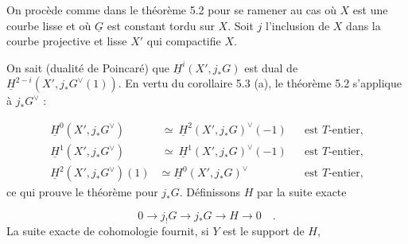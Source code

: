 On procède comme dans le théorème 5.2 pour se ramener au cas où $X$ est une courbe lisse et où $\underline{G}$ est constant tordu sur $X$. Soit $j$ l'inclusion de $X$ dans la courbe projective et lisse $X'$ qui compactifie $X$.

On sait (dualité de Poincaré) que $\underline{H}^i(X',j_*G)$ est dual de $\underline{H}^{2-i}(X',j_* G^\vee(1))$. En vertu du corollaire 5.3 (a), le théorème 5.2 s'applique à $j_*G^\vee$ :

\begin{align*}
\underline{H}^0(X',j_*G^\vee) &\ \simeq \ \underline{H}^2(X',j_*G)^\vee(-1) && \text{est \(T\)-entier,} \\
\underline{H}^1(X',j_*G^\vee) &\ \simeq \ \underline{H}^1(X',j_*G)^\vee(-1) && \text{est \(T\)-entier,} \\
\underline{H}^2(X',j_*G^\vee)(1) &\simeq \underline{H}^0(X',j_*G)^\vee && \text{est \(T\)-entier,}
\end{align*}
ce qui prouve le théorème pour $j_*G$. Définissons $H$ par la suite exacte

\begin{equation*}
0 \longrightarrow j_!G \longrightarrow j_*G \longrightarrow H \longrightarrow 0 \quad .
\end{equation*}
La suite exacte de cohomologie fournit, si $Y$ est le support de $H$,

